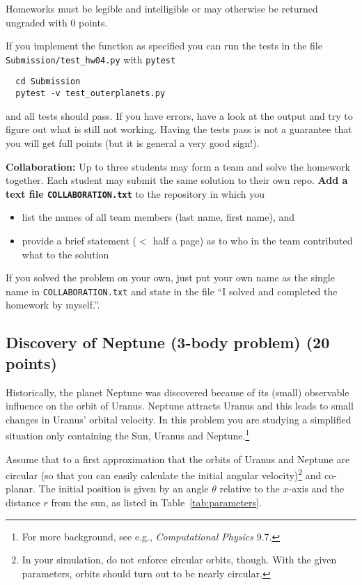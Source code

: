 \documentclass[letterpaper]{scrartcl}
\begin{document}
Homeworks must be legible and intelligible or may otherwise be
returned ungraded with 0 points.

If you implement the function as specified you can run the tests in
the file \texttt{Submission/test\_hw04.py} with \texttt{pytest}
\begin{verbatim}
  cd Submission
  pytest -v test_outerplanets.py
\end{verbatim}
and all tests should pass. If you have errors, have a look at the
output and try to figure out what is still not working. Having the
tests pass is not a guarantee that you will get full points (but it is
general a very good sign!).

\textbf{Collaboration:} Up to three students may form a team and solve
the homework together. Each student may submit the same solution to
their own repo. \textbf{Add a text file \texttt{COLLABORATION.txt}} to
the repository in which you
\begin{itemize}
\item list the names of all team members (last name, first name), and
\item provide a brief statement ($<$ half a page) as to who in the
  team contributed what to the solution
\end{itemize}
If you solved the problem on your own, just put your own name as the
single name in \texttt{COLLABORATION.txt} and state in the file ``I
solved and completed the homework by myself.''.

\subsection{Discovery of Neptune (3-body problem) (20 points)}
\label{sec:neptune}
Historically, the planet Neptune was discovered because of its (small)
observable influence on the orbit of Uranus. Neptune attracts Uranus
and this leads to small changes in Uranus' orbital velocity. In this
problem you are studying a simplified situation only containing the
Sun, Uranus and Neptune.\footnote{For more background, see e.g.,
  \emph{Computational Physics} 9.7.}

Assume that to a first approximation that the orbits of Uranus and
Neptune are circular (so that you can easily calculate the initial
angular velocity)\footnote{In your simulation, do not enforce circular
orbits, though. With the given parameters, orbits should turn out to
be nearly circular.} and co-planar. The initial position is given by
an angle $\theta$ relative to the $x$-axis and the distance $r$ from
the sun, as listed in Table~\ref{tab:parameters}.
\end{document}
